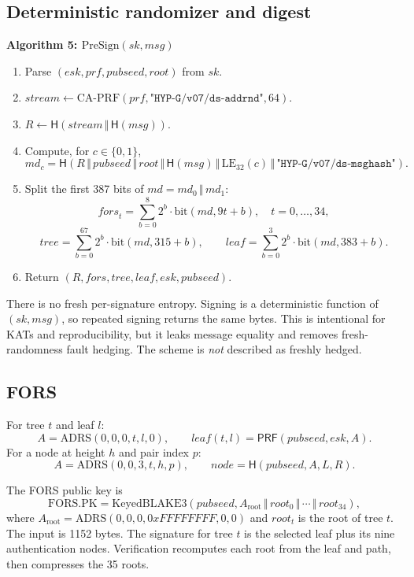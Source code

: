 \documentclass[runningheads]{llncs}
\newcommand{\concat}{\,\Vert\,}
\newcommand{\Hash}{\mathsf{H}}
\newcommand{\PRF}{\mathsf{PRF}}
\newenvironment{steps}[1]
  {\par\medskip\noindent\textbf{#1}\par\nopagebreak\small
   \begin{enumerate}[label=\arabic*:,leftmargin=*]}
  {\end{enumerate}\par\medskip}
\begin{document}
\subsection{Deterministic randomizer and digest}

\begin{steps}{Algorithm 5: $\mathrm{PreSign}(sk,\mathit{msg})$}
\item Parse $(\mathit{esk},\mathit{prf},\mathit{pubseed},
  \mathit{root})$ from $sk$.
\item $\mathit{stream}\gets\mathrm{CA\text{-}PRF}(\mathit{prf},
  \texttt{"HYP-G/v07/ds-addrnd"},64)$.
\item $R\gets\Hash(\mathit{stream}\concat\Hash(\mathit{msg}))$.
\item Compute, for $c\in\{0,1\}$,
  \[
   md_c=\Hash(R\concat\mathit{pubseed}\concat\mathit{root}
   \concat\Hash(\mathit{msg})\concat\mathrm{LE}_{32}(c)
   \concat\texttt{"HYP-G/v07/ds-msghash"}).
  \]
\item Split the first 387 bits of $md=md_0\concat md_1$:
  \[
   \mathit{fors}_t=\sum_{b=0}^{8}2^b\cdot
   \mathrm{bit}(md,9t+b),\quad t=0,\ldots,34,
  \]
  \[
   \mathit{tree}=\sum_{b=0}^{67}2^b\cdot
   \mathrm{bit}(md,315+b),\qquad
   \mathit{leaf}=\sum_{b=0}^{3}2^b\cdot
   \mathrm{bit}(md,383+b).
  \]
\item Return $(R,\mathit{fors},\mathit{tree},\mathit{leaf},
  \mathit{esk},\mathit{pubseed})$.
\end{steps}

There is no fresh per-signature entropy.  Signing is a deterministic
function of $(sk,\mathit{msg})$, so repeated signing returns the same
bytes.  This is intentional for KATs and reproducibility, but it leaks
message equality and removes fresh-randomness fault hedging.  The scheme
is \emph{not} described as freshly hedged.

\subsection{FORS}

\begin{definition}
For tree $t$ and leaf $l$:
\[
 A=\mathrm{ADRS}(0,0,0,t,l,0),\qquad
 \mathit{leaf}(t,l)=\PRF(\mathit{pubseed},\mathit{esk},A).
\]
For a node at height $h$ and pair index $p$:
\[
 A=\mathrm{ADRS}(0,0,3,t,h,p),\qquad
 \mathit{node}=\Hash(\mathit{pubseed},A,L,R).
\]
\end{definition}

The FORS public key is
\[
 \mathrm{FORS.PK}=\mathrm{KeyedBLAKE3}(\mathit{pubseed},
 A_{\mathrm{root}}\concat\mathit{root}_0\concat\cdots
 \concat\mathit{root}_{34}),
\]
where $A_{\mathrm{root}}=\mathrm{ADRS}(0,0,0,0xFFFFFFFF,0,0)$ and
$\mathit{root}_t$ is the root of tree $t$.  The input is 1152 bytes.
The signature for tree $t$ is the selected leaf plus its nine
authentication nodes.  Verification recomputes each root from the leaf
and path, then compresses the 35 roots.
\end{document}
